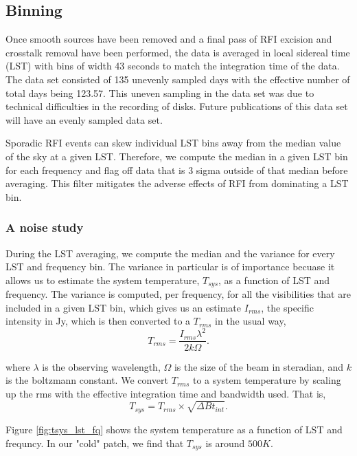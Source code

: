 \documentclass[twocolumn,numberedappendix]{emulateapj}
\begin{document}
\subsection{Binning}

Once smooth sources have been removed and a final pass of RFI excision and
crosstalk removal have been performed, the data is averaged in local sidereal
time (LST) with bins of width 43 seconds to match the integration time of the
data. The data set consisted of 135 unevenly sampled days with the effective
number of total days being 123.57. This uneven sampling in the data set was due
to technical difficulties in the recording of disks. Future publications of this
data set will have an evenly sampled data set.

Sporadic RFI events can skew individual LST bins away from the median value of
the sky at a given LST. Therefore, we compute the median in a given LST bin for
each frequency and flag off data that is 3 sigma outside of that median before
averaging. This filter mitigates the adverse effects of RFI from dominating a
LST bin. 

\subsubsection{A noise study}
During the LST averaging, we compute the median and the variance for every LST
and frequency bin. The variance in particular is of importance becuase it allows
us to estimate the system temperature, $T_{sys}$, as a function of LST and
frequency. The variance is computed, per frequency, for all the visibilities
that are included in a given LST bin, which gives us an estimate ${I_{rms}}$,
the specific intensity in Jy, which is then converted to a $T_{rms}$ in the
usual way, 
\begin{equation}
    T_{rms} = \frac{I_{rms}\lambda^{2}}{2k\Omega}.
\end{equation}

where $\lambda$ is the observing wavelength, $\Omega$ is the size of the beam in
steradian, and $k$ is the boltzmann constant. We convert $T_{rms}$ to a system
temperature by scaling up the rms with the effective integration time and
bandwidth used. That is, 
\begin{equation}
    T_{sys} = T_{rms} \times \sqrt{\Delta{B}t_{int}}.
\end{equation}

Figure \ref{fig:tsys_lst_fq} shows the system temperature as a function of
LST and frequncy. In our "cold" patch, we find that $T_{sys}$ is around $500K$.
\end{document}
